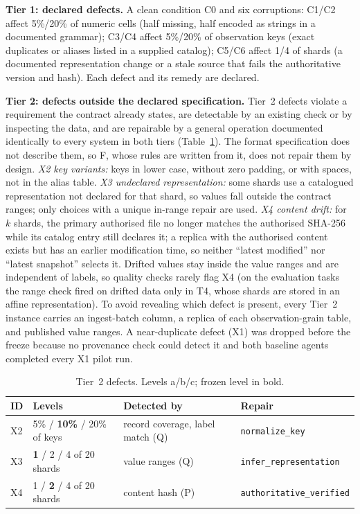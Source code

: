 \documentclass[conference]{IEEEtran}
\newcommand{\sys}[1]{\textsf{#1}}
\begin{document}
\textbf{Tier 1: declared defects.} A clean condition C0 and six corruptions: C1/C2 affect 5\%/20\% of numeric cells
(half missing, half encoded as strings in a documented grammar); C3/C4 affect 5\%/20\% of observation keys (exact
duplicates or aliases listed in a supplied catalog); C5/C6 affect 1/4 of shards (a documented representation change
or a stale source that fails the authoritative version and hash). Each defect and its remedy are declared.

\textbf{Tier 2: defects outside the declared specification.} Tier~2 defects violate a requirement the contract
already states, are detectable by an existing check or by inspecting the data, and are repairable by a general
operation documented identically to every system in both tiers (Table~\ref{tab:tier2}). The format specification
does not describe them, so \sys{F}, whose rules are written from it, does not repair them by design.
\emph{X2 key variants:} keys in lower case, without zero padding, or with spaces, not in the alias table.
\emph{X3 undeclared representation:} some shards use a catalogued representation not declared for that shard, so
values fall outside the contract ranges; only choices with a unique in-range repair are used.
\emph{X4 content drift:} for $k$ shards, the primary authorised file no longer matches the authorised SHA-256 while
its catalog entry still declares it; a replica with the authorised content exists but has an earlier modification
time, so neither ``latest modified'' nor ``latest snapshot'' selects it. Drifted values stay inside the value ranges
and are independent of labels, so quality checks rarely flag X4 (on the evaluation tasks the range check fired on
drifted data only in T4, whose shards are stored in an affine representation). To avoid revealing which defect is present, every
Tier~2 instance carries an ingest-batch column, a replica of each observation-grain table, and published value
ranges. A near-duplicate defect (X1) was dropped before the freeze because no provenance check could detect it and
both baseline agents completed every X1 pilot run.

\begin{table}[t]
\caption{Tier~2 defects. Levels a/b/c; frozen level in bold.}
\label{tab:tier2}
\centering\footnotesize\setlength{\tabcolsep}{3pt}
\begin{tabular}{@{}lp{}p{}l@{}}
\toprule
ID & Levels & Detected by & Repair \\
\midrule
X2 & 5\% / \textbf{10\%} / 20\% of keys & record coverage, label match (Q) & \texttt{\scriptsize normalize\_key} \\
X3 & \textbf{1} / 2 / 4 of 20 shards & value ranges (Q) & \texttt{\scriptsize infer\_representation} \\
X4 & 1 / \textbf{2} / 4 of 20 shards & content hash (P) & \texttt{\scriptsize authoritative\_verified} \\
\bottomrule
\end{tabular}
\end{table}
\end{document}
